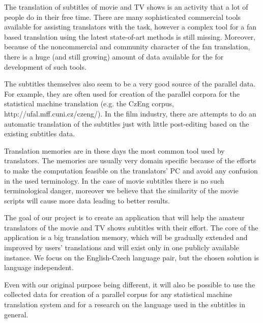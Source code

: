 
The translation of subtitles of movie and TV shows is an activity that  a lot of people do in their free time.
There are many sophisticated commercial tools available for assisting translators with the task, however a complex tool for a fan based translation using the latest state-of-art methods is still missing. 
Moreover, because of the noncommercial and community character of the fan translation, there is a huge (and still growing) amount of data available for the for development of such tools.

The subtitles themselves also seem to be a very good source of the parallel data. 
For example, they are often used for creation of the parallel corpora for the statistical machine translation (e.g. the CzEng corpus, http://ufal.mff.cuni.cz/czeng/).
In the film industry, there are attempts to do an automatic translation of the subtitles just with little post-editing based on the existing subtitles data.

Translation memories are in these days the most common tool used by translators.
The memories are usually very domain specific because of the efforts to make the computation feasible on the translators' PC and avoid any confusion in the used terminology. 
In the case of movie subtitles there is no such terminological danger, moreover we believe that the similarity of the movie scripts will cause more data  leading to better results.

The goal of our project is to create an application that will help the amateur translators of the movie and TV shows subtitles with their effort.
The core of the application is a big translation memory, which will be gradually extended and improved by users' translations and will exist only in one publicly available instance. We focus on the English-Czech language pair, but the chosen solution is language independent. 


Even with our original purpose being different, it will also be possible to use the collected data for creation of a parallel corpus for any statistical machine translation system and for a research on the language used in the subtitles in general.
